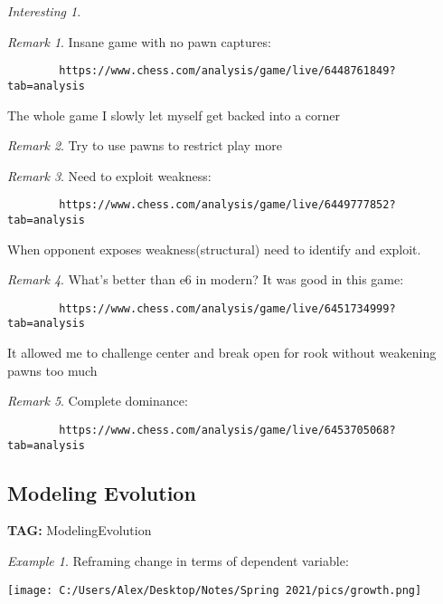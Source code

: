 \documentclass[11pt]{article}
\theoremstyle{remark}
\newtheorem{remark}{Remark}
\newtheorem{interest}{Interesting}
\newtheorem{example}{Example}
\begin{document}
\begin{interest}
\begin{remark}
	Insane game with no pawn captures:
	\begin{verbatim}
		https://www.chess.com/analysis/game/live/6448761849?tab=analysis
	\end{verbatim}

	The whole game I slowly let myself get backed into a corner
\end{remark}

\begin{remark}
	Try to use pawns to restrict play more
\end{remark}

\begin{remark}
	Need to exploit weakness:
	\begin{verbatim}
		https://www.chess.com/analysis/game/live/6449777852?tab=analysis
	\end{verbatim}

	When opponent exposes weakness(structural) need to identify and exploit.
\end{remark}

\begin{remark}
	What's better than e6 in modern?
	It was good in this game:
	\begin{verbatim}
		https://www.chess.com/analysis/game/live/6451734999?tab=analysis
	\end{verbatim}
	It allowed me to challenge center and break open for rook without weakening pawns too much
\end{remark}

\begin{remark}
	Complete dominance:
	\begin{verbatim}
		https://www.chess.com/analysis/game/live/6453705068?tab=analysis
	\end{verbatim}
	
\end{remark}


\subsection{Modeling Evolution}

\textbf{TAG:} ModelingEvolution

\begin{example}
	Reframing change in terms of dependent variable:
	
	\texttt{[image: C:/Users/Alex/Desktop/Notes/Spring 2021/pics/growth.png]}
\end{example}


\end{interest}
\end{document}
